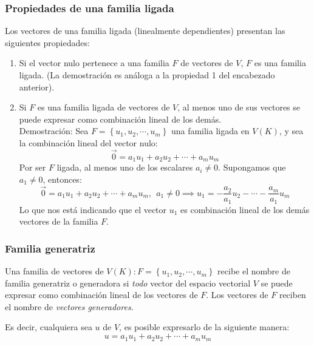 \subsubsection{Propiedades de una familia ligada}

Los vectores de una familia ligada (linealmente dependientes) presentan las siguientes propiedades:
\begin{enumerate}
  \item Si el vector nulo pertenece a una familia \(F\) de vectores de \(V\), \(F\) es una familia ligada. (La demostración es análoga a la propiedad 1 del encabezado anterior).
  \item Si \(F\) es una familia ligada de vectores de \(V\), al menos uno de sus vectores se puede expresar como combinación lineal de los demás. \\ Demostración: Sea \(F=\left\{u_1, u_2, \cdots, u_m\right\}\) una familia ligada en \(V(K)\), y sea la combinación lineal del vector nulo:\[
    \vec{0} = a_1 u_1 + a_2 u_2 + \cdots + a_m u_m
  \]
  Por ser \(F\) ligada, al menos uno de los escalares \(a_i \neq 0\). Supongamos que \(a_1 \neq 0\), entonces: \[
    \vec{0} = a_1 u_1 + a_2 u_2 + \cdots + a_m u_m, ~~ a_1 \neq 0 \implies u_1 = -\frac{a_2}{a_1}u_2 - \cdots - \frac{a_m}{a_1}u_m
  \]
  Lo que nos está indicando que el vector \(u_1\) es combinación lineal de los demás vectores de la familia \(F\).
\end{enumerate}

\subsubsection{Familia generatriz}

Una familia de vectores de \(V(K): F=\left\{u_1,u_2,\cdots,u_m\right\}\) recibe el nombre de familia generatriz o generadora si \textit{todo} vector del espacio vectorial \(V\) se puede expresar como combinación lineal de los vectores de \(F\). Los vectores de \(F\) reciben el nombre de \textit{vectores generadores}.

Es decir, cualquiera sea \(u\) de \(V\), es posible expresarlo de la siguiente manera:\[
  u = a_1 u_1 + a_2 u_2 + \cdots + a_m u_m
\]


\label{teo:generador_li}

